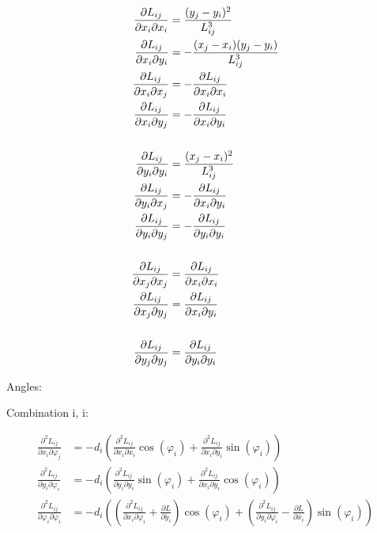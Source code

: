 
\begin{align}
\frac{\partial L_{ij}}{\partial x_i \partial x_i} &= \frac{(y_j - y_i)^2}{L_{ij}^3} \\
\frac{\partial L_{ij}}{\partial x_i \partial y_i} &= -\frac{(x_j - x_i)(y_j - y_i)}{L_{ij}^3} \\
\frac{\partial L_{ij}}{\partial x_i \partial x_j} &= -\frac{\partial L_{ij}}{\partial x_i \partial x_i} \\
\frac{\partial L_{ij}}{\partial x_i \partial y_j} &= -\frac{\partial L_{ij}}{\partial x_i \partial y_i} \\
\notag \\
\frac{\partial L_{ij}}{\partial y_i \partial y_i} &= \frac{(x_j - x_i)^2}{L_{ij}^3} \\
\frac{\partial L_{ij}}{\partial y_i \partial x_j} &= -\frac{\partial L_{ij}}{\partial x_i \partial y_i} \\
\frac{\partial L_{ij}}{\partial y_i \partial y_j} &= -\frac{\partial L_{ij}}{\partial y_i \partial y_i} \\
\notag \\
\frac{\partial L_{ij}}{\partial x_j \partial x_j} &= \frac{\partial L_{ij}}{\partial x_i \partial x_i} \\
\frac{\partial L_{ij}}{\partial x_j \partial y_j} &= \frac{\partial L_{ij}}{\partial x_i \partial y_i} \\
\notag \\
\frac{\partial L_{ij}}{\partial y_j \partial y_j} &= \frac{\partial L_{ij}}{\partial y_i \partial y_i}
\end{align}

\newpage
Angles:

Combination i, i:

\begin{align}
\frac{\partial^2 L_{ij}}{\partial x_{i} \partial \varphi_{j}} &= -d_{i}\left( \frac{\partial^2 L_{ij}}{\partial x_{i} \partial x_{i}}\cos(\varphi_{i}) + \frac{\partial^2 L_{ij}}{\partial x_{i} \partial y_{i}}\sin(\varphi_{i})\right) \\
\frac{\partial^2 L_{ij}}{\partial y_{i} \partial \varphi_{i}} &= -d_{i}\left( \frac{\partial^2 L_{ij}}{\partial y_{i} \partial y_{i}}\sin(\varphi_{i}) + \frac{\partial^2 L_{ij}}{\partial x_{i} \partial y_{i}}\cos(\varphi_{i})\right) \\
\frac{\partial^2 L_{ij}}{\partial \varphi_{i} \partial \varphi_{i}} &= -d_{i}\left(\left(\frac{\partial^2 L_{ij}}{\partial x_{i} \partial \varphi_{i}} + \frac{\partial L}{\partial \bar{y}_{i}}\right)\cos(\varphi_{i}) + \left(\frac{\partial^2 L_{ij}}{\partial y_{i} \partial \varphi_{i}} - \frac{\partial L}{\partial \bar{x}_{i}}\right)\sin(\varphi_{i})\right)
\end{align}

